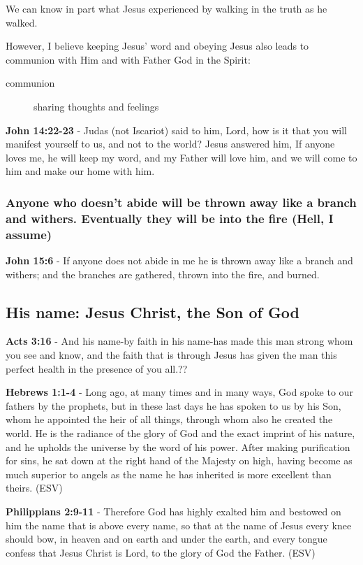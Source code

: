 \documentclass[11pt]{article}
\begin{document}
We can know in part what Jesus experienced by walking in the truth as he walked.

However, I believe keeping Jesus' word and obeying Jesus also leads to communion with Him and with Father God in the Spirit:

\begin{description}
\item[{communion}] sharing thoughts and feelings
\end{description}

\textbf{John 14:22-23} - Judas (not Iscariot) said to him, Lord, how is it that you will manifest yourself to us, and not to the world? Jesus answered him, If anyone loves me, he will keep my word, and my Father will love him, and we will come to him and make our home with him.

\subsubsection{Anyone who doesn't abide will be thrown away like a branch and withers. Eventually they will be into the fire (Hell, I assume)}
\label{sec:orgc98285c}
\textbf{John 15:6} - If anyone does not abide in me he is thrown away like a branch and withers; and the branches are gathered, thrown into the fire, and burned.

\subsection{His name: Jesus Christ, the Son of God}
\label{sec:orgc11c7c1}
\textbf{Acts 3:16} - And his name-by faith in his name-has made this man strong whom you see and know, and the faith that is through Jesus has given the man this perfect health in the presence of you all.??

\textbf{Hebrews 1:1-4} -  Long ago, at many times and in many ways, God spoke to our fathers by the prophets, but in these last days he has spoken to us by his Son, whom he appointed the heir of all things, through whom also he created the world.  He is the radiance of the glory of God and the exact imprint of his nature, and he upholds the universe by the word of his power.  After making purification for sins, he sat down at the right hand of the Majesty on high, having become as much superior to angels as the name he has inherited is more excellent than theirs. (ESV)

\textbf{Philippians 2:9-11} - Therefore God has highly exalted him and bestowed on him the name that is above every name, so that at the name of Jesus every knee should bow, in heaven and on earth and under the earth, and every tongue confess that Jesus Christ is Lord, to the glory of God the Father. (ESV)
\end{document}
